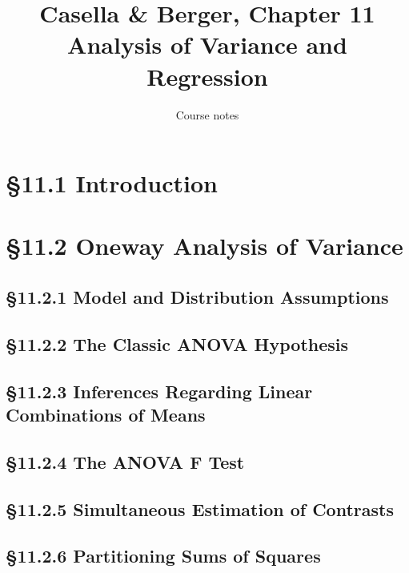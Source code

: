 \documentclass[11pt]{article}
\title{Casella \& Berger, Chapter 11\\[2pt]\large Analysis of Variance and Regression}
\author{Course notes}\date{}
\begin{document}
\maketitle


\section{\S11.1 Introduction}

\section{\S11.2 Oneway Analysis of Variance}

\subsection{\S11.2.1 Model and Distribution Assumptions}

\subsection{\S11.2.2 The Classic ANOVA Hypothesis}

\subsection{\S11.2.3 Inferences Regarding Linear Combinations of Means}

\subsection{\S11.2.4 The ANOVA F Test}

\subsection{\S11.2.5 Simultaneous Estimation of Contrasts}

\subsection{\S11.2.6 Partitioning Sums of Squares}
\end{document}
